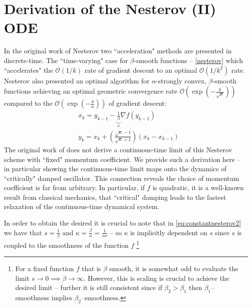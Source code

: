 \section{Derivation of the Nesterov (II) ODE}
In the original work of Nesterov \cite{DBLP:journals/ftml/Bubeck15, nesterov2004introductory} two ``acceleration" methods are presented in discrete-time. The ``time-varying" case for $\beta$-smooth functions -- \eqref{nesterov} which ``accelerates" the $\mathcal{O}(1/k)$ rate of gradient descent to an optimal $\mathcal{O}(1/k^2)$ rate. Nesterov also presented an optimal algorithm for $\alpha$-strongly convex, $\beta$-smooth functions achieving an optimal geometric convergence rate $\mathcal{O} \left (\exp(-\frac{k}{\sqrt{\kappa}}) \right)$ compared to the $\mathcal{O} \left (\exp(-\frac{k}{\kappa}) \right)$ of gradient descent:
\begin{align}
    & x_{k} = y_{k-1} - \underbrace{\frac{1}{\beta}}_{s} \nabla f(y_{k-1}) \label{eq:constantnesterov1} \\
    & y_{k} = x_{k} + \left( \frac{\sqrt{\kappa}-1}{\sqrt{\kappa}+1} \right) \left( x_{k} - x_{k-1} \right)  \label{eq:constantnesterov2}
\end{align}
 The original work of \cite{su2014differential} does not derive a continuous-time limit of this Nesterov scheme with ``fixed" momentum coefficient. We provide such a derivation here -- in particular showing the continuous-time limit maps onto the dynamics of ``critically" damped oscillator. This connection reveals the choice of momentum coefficient is far from arbitrary. In particular, if $f$ is quadratic, it is a well-known result from classical mechanics, that ``critical" damping leads to the fastest relaxation of the continuous-time dynamical system.
 

 
 In order to obtain the desired it is crucial to note that in \eqref{eq:constantnesterov2} we have that $s = \frac{1}{\beta}$ and $\kappa = \frac{\beta}{\alpha} = \frac{1}{\alpha s}$ -- so $\kappa$ is implicitly dependent on $s$ since $s$ is coupled to the smoothness of the function $f$ \footnote{For a fixed function $f$ that is $\beta$ smooth, it is somewhat odd to evaluate the limit $s \to 0 \implies \beta \to \infty$. However, this is scaling is crucial to achieve the desired limit -- further it is still consistent since if $\beta_2 > \beta_1$ then $\beta_1$--smoothness implies $\beta_2$--smoothness.}
 
